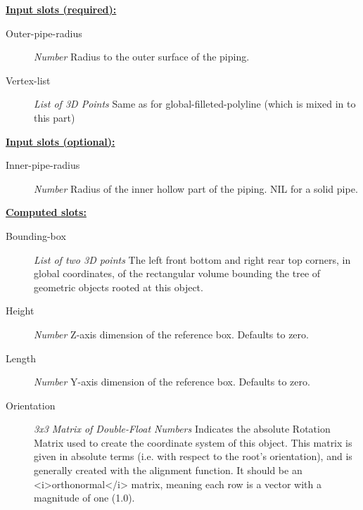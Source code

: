 \documentclass [11pt]{book}
\begin{document}
\begin{itemize}
\begin{figure}
\label{fig:route-pipe}

\end{figure}





\textbf{
\underline{Input slots (required):}}

\begin{description}

\item [Outer-pipe-radius]
\emph{Number} Radius to the outer surface of the piping.


\item [Vertex-list]
\emph{List of 3D Points} Same as for global-filleted-polyline (which is mixed in to this part)


\end{description}






\textbf{
\underline{Input slots (optional):}}

\begin{description}

\item [Inner-pipe-radius]
\emph{Number} Radius of the inner hollow part of the piping. NIL for a solid pipe.


\end{description}






\textbf{
\underline{Computed slots:}}

\begin{description}

\item [Bounding-box]
\emph{List of two 3D points} The left front bottom and right rear top corners, in global coordinates,
of the rectangular volume bounding the tree of geometric objects rooted at this object.


\item [Height]
\emph{Number} Z-axis dimension of the reference box. Defaults to zero.


\item [Length]
\emph{Number} Y-axis dimension of the reference box. Defaults to zero.


\item [Orientation]
\emph{3x3 Matrix of Double-Float Numbers} Indicates the absolute Rotation Matrix used to create
the coordinate system of this object. This matrix is given in absolute terms (i.e. with
respect to the root's orientation), and is generally created with the alignment function.
It should be an <i>orthonormal</i> matrix, meaning each row is a vector with a magnitude
of one (1.0).



\end{description}
\end{itemize}
\end{document}
